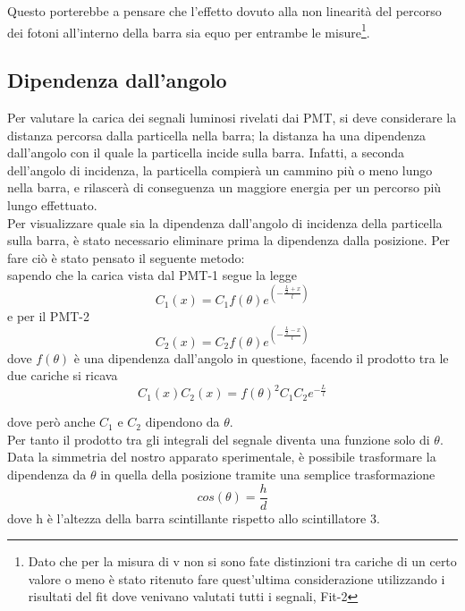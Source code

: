 \documentclass[a4paper,twocolumn]{article}
\begin{document}
Questo porterebbe a pensare che l'effetto dovuto alla non linearità del percorso dei fotoni all'interno della barra sia equo per entrambe le misure\footnote{Dato che per la misura di v non si sono fate distinzioni tra cariche di un certo valore o meno è stato ritenuto fare quest'ultima considerazione utilizzando i risultati del fit dove venivano valutati tutti i segnali, Fit-2}.

\subsection{Dipendenza dall'angolo}
\label{sec:Angolo}
Per valutare la carica dei segnali luminosi rivelati dai PMT, si deve considerare la distanza percorsa dalla particella nella barra; la distanza ha una dipendenza dall'angolo con il quale la particella incide sulla barra. Infatti, a seconda dell'angolo di incidenza, la particella compierà un cammino più o meno lungo nella barra, e rilascerà di conseguenza un maggiore energia per un percorso più lungo effettuato.\\
Per visualizzare quale sia la dipendenza dall'angolo di incidenza della particella sulla barra, è stato necessario eliminare prima la dipendenza dalla posizione. Per fare ciò è stato pensato il seguente metodo:\\
sapendo che la carica vista dal PMT-1 segue la legge
\begin{equation}
C_1(x) = C_1 f(\theta)e^{(-\frac{\frac{L}{2}+x}{l})}
\end{equation}
e per il PMT-2
\begin{equation}
C_2(x) = C_2f(\theta)e^{(-\frac{\frac{L}{2}-x}{l})}
\end{equation}
dove $f(\theta)$ è una dipendenza dall'angolo in questione, facendo il prodotto tra le due cariche si ricava
\begin{equation}
C_1(x)C_2(x) = f(\theta)^2 C_1C_2 e^{-\frac{L}{l}}
\end{equation}

dove però anche $C_1$ e $C_2$ dipendono da $\theta$.\\
Per tanto il prodotto tra gli integrali del segnale diventa una funzione solo di $\theta$.\\
Data la simmetria del nostro apparato sperimentale, è possibile trasformare la dipendenza da $\theta$ in quella della posizione tramite una semplice trasformazione
\begin{equation}
cos(\theta) = \frac{h}{d}
\label{equ:XtoTheta}
\end{equation}
dove h è l'altezza della barra scintillante rispetto allo scintillatore 3.
\end{document}
